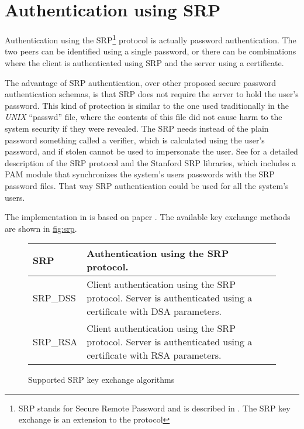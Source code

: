 \section{Authentication using SRP}

Authentication using the SRP\footnote{SRP stands for Secure Remote Password and 
is described in \cite{RFC2945}. The SRP key exchange is an extension to the \tlsI{} protocol}
protocol is actually password authentication. The two peers can be identified using a
single password, or there can be combinations where the client is 
authenticated using SRP and the server using a certificate.
\par
The advantage of SRP authentication, over other proposed secure password 
authentication schemas, is that SRP does not require the server to hold
the user's password. This kind of protection is similar to the one used traditionally
in the \emph{UNIX} ``passwd'' file, where the contents of this file did not cause
harm to the system security if they were revealed.
The SRP needs instead of the plain password something called a verifier, 
which is calculated using the user's password, and if stolen cannot
be used to impersonate the user. See \cite{TOMSRP} for a detailed description
of the SRP protocol and the Stanford SRP libraries, which includes a PAM module
that synchronizes the system's users passwords with the SRP password files. That
way SRP authentication could be used for all the system's users.

\par
The implementation in \gnutls{} is based on paper \cite{TLSSRP}.
The available key exchange methods are shown in \hyperref{figure}{figure }{}{fig:srp}.

\begin{figure}[hbtp]
\begin{tabular}{|l|p{9cm}|}

\hline
SRP & Authentication using the SRP protocol. 
\\
\hline
SRP\_DSS & Client authentication using the SRP protocol. Server is 
authenticated using a certificate with DSA parameters.
\\
\hline
SRP\_RSA & Client authentication using the SRP protocol. Server is 
authenticated using a certificate with RSA parameters.
\\
\hline
\end{tabular}

\caption{Supported SRP key exchange algorithms}
\label{fig:srp}

\end{figure}

